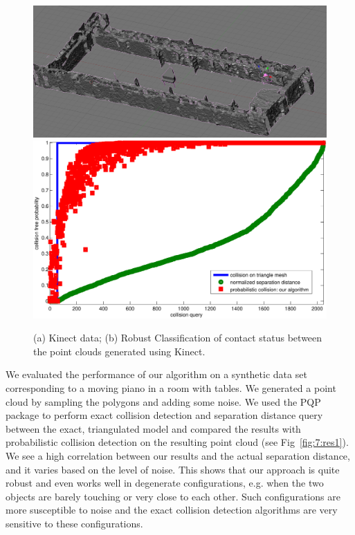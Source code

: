 \begin{figure}[htb]
  \centering
  \includegraphics[width=0.79\linewidth]{figs/7/kinect.png}
  \includegraphics[width=0.79\linewidth]{figs/7/kinect.pdf}
  \caption[Comparison between the results for $100$ random queries between prior collision detection algorithms for exact triangle meshes and our
  algorithm on the Kinect data]{\label{fig:7:res3} (a) Kinect data; (b) Robust Classification of contact status between the point clouds generated using Kinect.}
\end{figure}



We evaluated the performance of our algorithm on a synthetic data set corresponding to a moving piano in a room with tables.
We generated a point cloud by sampling the polygons and adding some noise. We used the PQP package to perform exact collision detection and separation
distance query between the exact, triangulated model and compared the results with probabilistic collision detection on the resulting point cloud (see Fig~\ref{fig:7:res1}). We see a high correlation between our results and the actual separation distance, and it varies based on the level of noise.
This shows that our approach is quite robust and even works well in degenerate configurations, e.g. when the two objects are barely touching or very close to each other. Such configurations are more susceptible to noise and the exact collision detection algorithms are very sensitive to these configurations.


